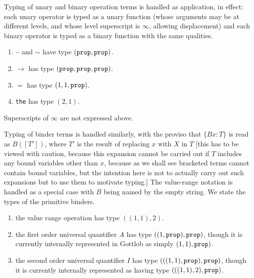 \documentclass{article}
\begin{document}
{{Typing of unary and binary operation terms is handled as application, in effect:  each unary operator is typed as a unary function (whose arguments may be at different levels, and whose level superscript is $\infty$, allowing displacement) and each binary operator is typed as a binary function with the same qualities.  

\begin{enumerate}

\item  {\bf --} and $\sim$ have type $({\tt prop},{\tt prop})$.

\item $\rightarrow$ has type $({\tt prop},{\tt prop},{\tt prop})$.

\item $=$ has type $(1,1,{\tt prop})$.

\item {\tt the} has type $(2,1)$.

\end{enumerate}

Superscripts of $\infty$ are not expressed above.

Typing of binder terms is handled similarly, with the proviso that $\{Bx:T\}$ is read as $B([T'])$, where $T'$ is the result of replacing $x$ with $X$ in $T$ [this has to be viewed with caution, because this expansion cannot be carried out if $T$ includes any bound variables other than $x$, because as we shall see bracketed terms cannot contain bound variables, but the intention here is not to actually carry out such expansions but to use them to motivate typing.]  The value-range notation is handled as a special case with $B$ being named by the empty string.  We state the types of the primitive binders.

\begin{enumerate}

\item the value range operation has type $((1,1),2)$.

\item the first order universal quantifier $A$ has type $((1,{\tt prop}),{\tt prop})$, though it is currently internally represented in Gottlob as simply $(1,1),{\tt prop})$.

\item the second order universal quantifier $I$ has type $(((1,1),{\tt prop}),{\tt prop})$, though it is currently internally represented as having type
$(((1,1),2),{\tt prop})$.

\end{enumerate}

}}
\end{document}
